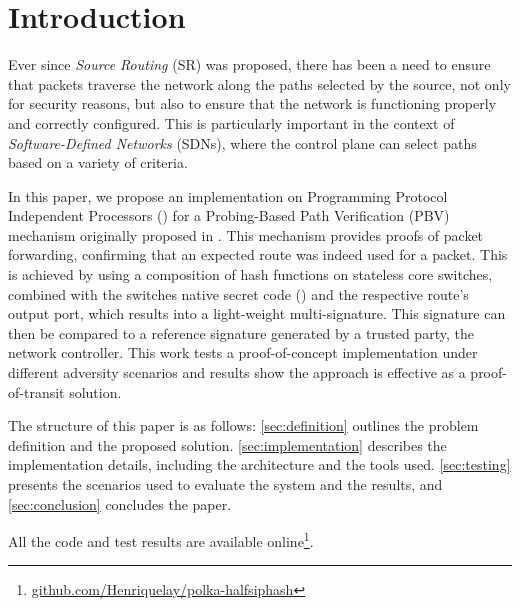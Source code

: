 \section{Introduction}


Ever since \textit{Source Routing} (SR) was proposed, there has been a need to ensure that packets traverse the network along the paths selected by the source, not only for security reasons, but also to ensure that the network is functioning 
properly
and correctly configured. This is particularly important in the context of \textit{Software-Defined Networks} (SDNs), where the control plane can select paths based on a variety of criteria\cite{SRSDN}.

In this paper, we propose an implementation on Programming Protocol Independent Processors (\pIV) for 
a Probing-Based Path Verification (PBV) mechanism originally proposed in \pathsec\cite{pathsec}. This mechanism provides proofs of packet forwarding, confirming that an expected route was indeed used for a packet.
This is achieved by using a composition of hash functions on stateless core switches, 
combined with the switches native secret code (\nodeids) and the respective route's output port, which results into a light-weight multi-signature. This signature  can then be compared
to a reference signature generated by a trusted party, the network controller. This work tests a proof-of-concept implementation under different adversity scenarios and results show the approach is effective as a proof-of-transit solution.

The structure of this paper is as follows: \autoref{sec:definition} outlines the problem definition and the proposed solution. \autoref{sec:implementation} describes the implementation details, including the architecture and the tools used. \autoref{sec:testing} presents the scenarios used to evaluate the system and the results, and \autoref{sec:conclusion} concludes the paper.

All the code and test results are available online\footnote{\url{github.com/Henriquelay/polka-halfsiphash}}.
